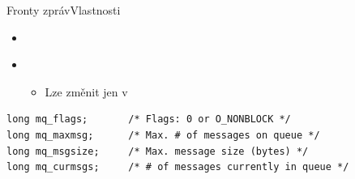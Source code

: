 \begin{frame}[fragile]{Fronty zpráv}{Vlastnosti}

  \begin{itemize}
    \item \small {}

    \pause

    \item \small {} \\
    \begin{itemize}
      \item Lze změnit jen  v 
    \end{itemize}
  \end{itemize}


  \begin{block}{}
  \begin{lstlisting}
long mq_flags;       /* Flags: 0 or O_NONBLOCK */
long mq_maxmsg;      /* Max. # of messages on queue */
long mq_msgsize;     /* Max. message size (bytes) */
long mq_curmsgs;     /* # of messages currently in queue */
  \end{lstlisting}
  \end{block}

\end{frame}

